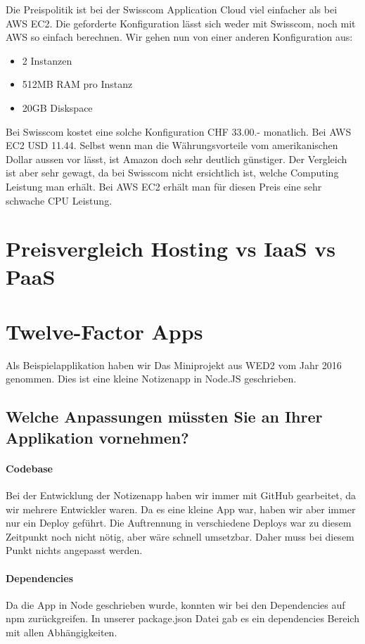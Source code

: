 Die Preispolitik ist bei der Swisscom Application Cloud viel einfacher als bei AWS EC2. Die geforderte Konfiguration lässt sich weder mit Swisscom, noch mit AWS so einfach berechnen. Wir gehen nun von einer anderen Konfiguration aus:
\begin{itemize}
\item 2 Instanzen
\item 512MB RAM pro Instanz
\item 20GB Diskspace
\end{itemize}

Bei Swisscom kostet eine solche Konfiguration CHF 33.00.- monatlich. Bei AWS EC2 USD 11.44. Selbst wenn man die Währungsvorteile vom amerikanischen Dollar aussen vor lässt, ist Amazon doch sehr deutlich günstiger. Der Vergleich ist aber sehr gewagt, da bei Swisscom nicht ersichtlich ist, welche Computing Leistung man erhält. Bei AWS EC2 erhält man für diesen Preis eine sehr schwache CPU Leistung.

\chapter{Preisvergleich Hosting vs IaaS vs PaaS}
\chapter{Twelve-Factor Apps}
Als Beispielapplikation haben wir Das Miniprojekt aus WED2 vom Jahr 2016 genommen. Dies ist eine kleine Notizenapp in Node.JS geschrieben.
\section{Welche Anpassungen müssten Sie an Ihrer Applikation vornehmen?}
\subsubsection{Codebase}
Bei der Entwicklung der Notizenapp haben wir immer mit GitHub gearbeitet, da wir mehrere Entwickler waren. Da es eine kleine App war, haben wir aber immer nur ein Deploy geführt. Die Auftrennung in verschiedene Deploys war zu diesem Zeitpunkt noch nicht nötig, aber wäre schnell umsetzbar. Daher muss bei diesem Punkt nichts angepasst werden. 
\subsubsection{Dependencies}
Da die App in Node geschrieben wurde, konnten wir bei den Dependencies auf npm zurückgreifen. In unserer package.json Datei gab es ein dependencies Bereich mit allen Abhängigkeiten.
